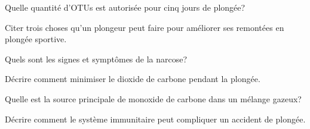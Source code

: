 \documentclass[english,12pt,a4paper]{article}
\begin{document}
\begin{outline}
		\1 Quelle quantité d'OTUs est autorisée pour cinq jours de plongée?
			\2 \hspace{-2em}\hrulefill

		\1 Citer trois choses qu'un plongeur peut faire pour améliorer ses remontées en plongée sportive.
			\2 \hspace{-2em}\hrulefill
			\2 \hspace{-2em}\hrulefill
			\2 \hspace{-2em}\hrulefill

		\1 Quels sont les signes et symptômes de la narcose?
			\2 \hspace{-2em}\hrulefill
			\2 \hspace{-2em}\hrulefill
			\2 \hspace{-2em}\hrulefill

		\1 Décrire comment minimiser le dioxide de carbone pendant la plongée.
			\2 \hspace{-2em}\hrulefill
			\2 \hspace{-2em}\hrulefill
			\2 \hspace{-2em}\hrulefill
			\2 \hspace{-2em}\hrulefill

		\1 Quelle est la source principale de monoxide de carbone dans un mélange gazeux?
			\2 \hspace{-2em}\hrulefill
			\2 \hspace{-2em}\hrulefill

		\1 Décrire comment le système immunitaire peut compliquer un accident de plongée.
			\2 \hspace{-2em}\hrulefill
			\2 \hspace{-2em}\hrulefill
			\2 \hspace{-2em}\hrulefill
			\2 \hspace{-2em}\hrulefill
	\end{outline}
	\pagebreak

\end{document}
